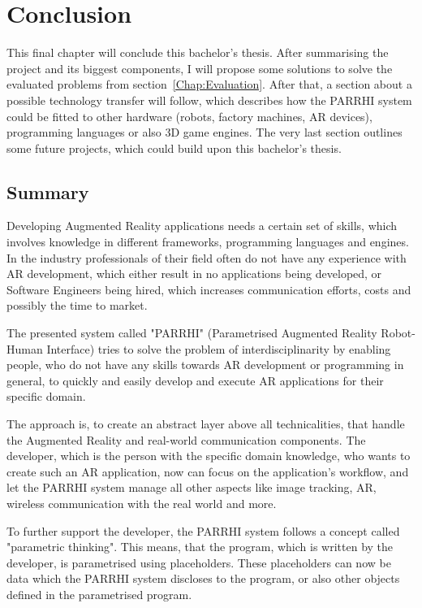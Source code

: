 \chapter{Conclusion}\label{Chap:Conclusion}

This final chapter will conclude this bachelor's thesis. After summarising the project and its biggest components, I will propose some solutions to solve the evaluated problems from section~\ref{Chap:Evaluation}. After that, a section about a possible technology transfer will follow, which describes how the PARRHI system could be fitted to other hardware (robots, factory machines, AR devices), programming languages or also 3D game engines. The very last section outlines some future projects, which could build upon this bachelor's thesis.

\section{Summary}

Developing Augmented Reality applications needs a certain set of skills, which involves knowledge in different frameworks, programming languages and engines. In the industry professionals of their field often do not have any experience with AR development, which either result in no applications being developed, or Software Engineers being hired, which increases communication efforts, costs and possibly the time to market. 

The presented system called "PARRHI" (Parametrised Augmented Reality Robot-Human Interface) tries to solve the problem of interdisciplinarity by enabling people, who do not have any skills towards AR development or programming in general, to quickly and easily develop and execute AR applications for their specific domain. 

The approach is, to create an abstract layer above all technicalities, that handle the Augmented Reality and real-world communication components. The developer, which is the person with the specific domain knowledge, who wants to create such an AR application, now can focus on the application's workflow, and let the PARRHI system manage all other aspects like image tracking, AR, wireless communication with the real world and more.

To further support the developer, the PARRHI system follows a concept called "parametric thinking". This means, that the program, which is written by the developer, is parametrised using placeholders. These placeholders can now be data which the PARRHI system discloses to the program, or also other objects defined in the parametrised program. 

